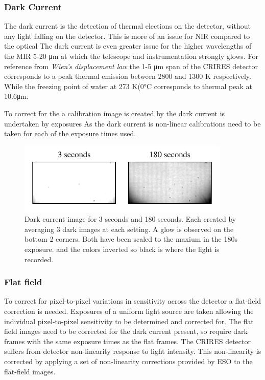 \subsubsection{Dark Current}
The dark current is the detection of thermal elections on the detector, without any light falling on the detector. This is more of an issue for NIR compared to the optical  The dark current is even greater issue for the higher wavelengths of the MIR 5-20  \si{\micro\meter} at which the telescope and instrumentation strongly glows. 
For reference from \emph{Wien's displacement law} the 1-5 \si{\micro\meter} span of the CRIRES detector corresponds to a peak thermal emission between 2800 and 1300 K respectively.  
While the freezing point of water at 273 K(0\si{\celsius} corresponds to thermal peak at 10.6\si{\micro\meter}.

To correct for the a calibration image is created by  the dark current is undertaken by exposures
As the dark current is non-linear calibrations need to be taken for each of the exposure times used. 


\begin{figure}[h]
    \centering
\includegraphics[width=0.9\textwidth]{figures/reduction/master_darks_inverted.pdf}
\caption{Dark current image for 3 seconds and 180 seconds. Each created by averaging 3 dark images at each setting. A glow is observed on the bottom 2 corners. Both have been scaled to the maxium in the 180s exposure. and the colors inverted so black is where the light is recorded.}
\end{figure}



\subsubsection{Flat field}
To correct for pixel-to-pixel variations in sensitivity across the detector a flat-field correction is needed. Exposures of a uniform light source are taken allowing the individual pixel-to-pixel sensitivity to be determined and corrected for. The flat field images need to be corrected for the dark current present, so require dark frames with the same exposure times as the flat frames.
The CRIRES detector suffers from detector non-linearity response to light intensity. This non-linearity is corrected by applying a set of non-linearity corrections provided by ESO to the flat-field images.  



